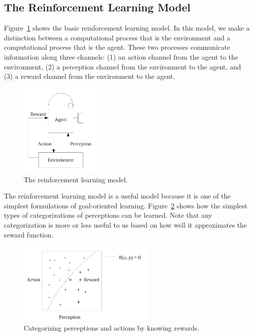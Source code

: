 \subsection{The Reinforcement Learning Model}

Figure~\ref{fig:reinforcement_learning} shows the basic reinforcement
learning model.  In this model, we make a distinction between a
computational process that is the environment and a computational
process that is the agent.  These two processes communicate
information along three channels: (1) an action channel from the agent
to the environment, (2) a perception channel from the environment to
the agent, and (3) a reward channel from the environment to the agent.

\begin{figure}[bth]
  \center
  \includegraphics[width=4cm]{gfx/reinforcement_learning}
  \caption[The reinforcement learning model]{The reinforcement learning model.}
  \label{fig:reinforcement_learning}
\end{figure}

The reinforcement learning model is a useful model because it is one
of the simplest formulations of goal-oriented learning.
Figure~\ref{fig:perception_categorization} shows how the simplest
types of categorizations of perceptions can be learned.  Note that any
categorization is more or less useful to us based on how well it
approximates the reward function.

\begin{figure}[bth]
  \center
  \includegraphics[height=4cm]{gfx/perception_categorization}
  \caption[Categorizing perceptions and actions by knowing rewards]{Categorizing perceptions and actions by knowing rewards.}
  \label{fig:perception_categorization}
\end{figure}


